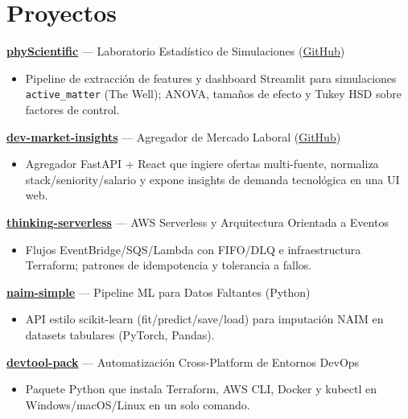 \documentclass[10pt,a4paper]{article}
\begin{document}
\section*{Proyectos}

\textbf{\href{https://physcientific.onrender.com/}{phyScientific}} --- Laboratorio Estad\'istico de Simulaciones (\href{https://github.com/Emilio-Gordillo-Esparragoza/phyScientific}{GitHub})\\
\begin{itemize}
    \item Pipeline de extracci\'on de features y dashboard Streamlit para simulaciones \texttt{active\_matter} (The Well); ANOVA, tama\~nos de efecto y Tukey HSD sobre factores de control.
\end{itemize}

\textbf{\href{https://dev-market-insights.vercel.app}{dev-market-insights}} --- Agregador de Mercado Laboral (\href{https://github.com/Emilio-Gordillo-Esparragoza/dev-market-insights}{GitHub})\\
\begin{itemize}
    \item Agregador FastAPI + React que ingiere ofertas multi-fuente, normaliza stack/seniority/salario y expone insights de demanda tecnol\'ogica en una UI web.
\end{itemize}

\textbf{\href{https://github.com/Emilio-Gordillo-Esparragoza/thinking-serverless}{thinking-serverless}} --- AWS Serverless y Arquitectura Orientada a Eventos\\
\begin{itemize}
    \item Flujos EventBridge/SQS/Lambda con FIFO/DLQ e infraestructura Terraform; patrones de idempotencia y tolerancia a fallos.
\end{itemize}

\textbf{\href{https://github.com/Emilio-Gordillo-Esparragoza/naim-simple}{naim-simple}} --- Pipeline ML para Datos Faltantes (Python)\\
\begin{itemize}
    \item API estilo scikit-learn (fit/predict/save/load) para imputaci\'on NAIM en datasets tabulares (PyTorch, Pandas).
\end{itemize}

\textbf{\href{https://github.com/Emilio-Gordillo-Esparragoza/devtool-pack}{devtool-pack}} --- Automatizaci\'on Cross-Platform de Entornos DevOps\\
\begin{itemize}
    \item Paquete Python que instala Terraform, AWS CLI, Docker y kubectl en Windows/macOS/Linux en un solo comando.
\end{itemize}
\end{document}
